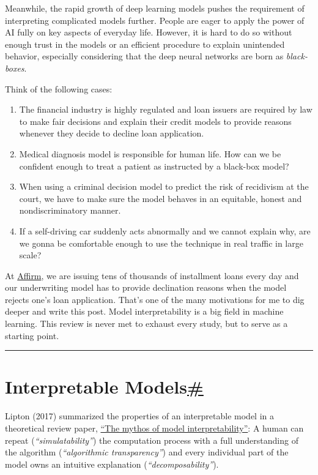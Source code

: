 Meanwhile, the rapid growth of deep learning models pushes the requirement of interpreting complicated models further. People are eager to apply the power of AI fully on key aspects of everyday life. However, it is hard to do so without enough trust in the models or an efficient procedure to explain unintended behavior, especially considering that the deep neural networks are born as \emph{black-boxes}.

Think of the following cases:

\begin{enumerate}
\tightlist
\item
  The financial industry is highly regulated and loan issuers are required by law to make fair decisions and explain their credit models to provide reasons whenever they decide to decline loan application.
\item
  Medical diagnosis model is responsible for human life. How can we be confident enough to treat a patient as instructed by a black-box model?
\item
  When using a criminal decision model to predict the risk of recidivism at the court, we have to make sure the model behaves in an equitable, honest and nondiscriminatory manner.
\item
  If a self-driving car suddenly acts abnormally and we cannot explain why, are we gonna be comfortable enough to use the technique in real traffic in large scale?
\end{enumerate}

At \href{https://www.affirm.com/}{Affirm}, we are issuing tens of thousands of installment loans every day and our underwriting model has to provide declination reasons when the model rejects one's loan application. That's one of the many motivations for me to dig deeper and write this post. Model interpretability is a big field in machine learning. This review is never met to exhaust every study, but to serve as a starting point.

\begin{center}\rule{0.5\linewidth}{0.5pt}\end{center}

\section{\texorpdfstring{Interpretable Models\hyperref[interpretable-models]{\#}}{Interpretable Models\#}}\label{interpretable-models}

Lipton (2017) summarized the properties of an interpretable model in a theoretical review paper, \href{https://arxiv.org/pdf/1606.03490.pdf}{``The mythos of model interpretability''}: A human can repeat (\emph{``simulatability''}) the computation process with a full understanding of the algorithm (\emph{``algorithmic transparency''}) and every individual part of the model owns an intuitive explanation (\emph{``decomposability''}).

